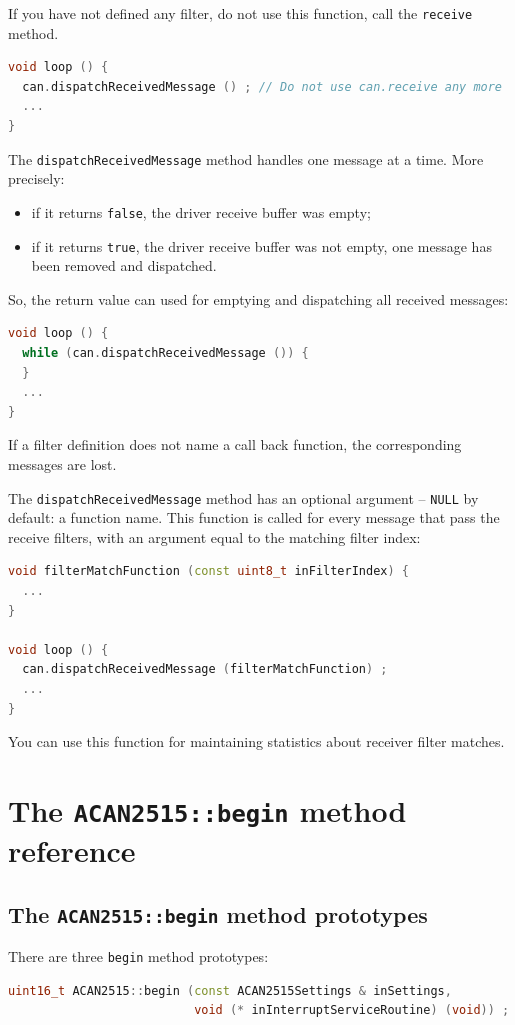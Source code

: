 \documentclass[9pt, a4paper, obeyspaces]{extarticle}
\newcommand \sectionLabel[2]{\section{#1}\label{sec:#2}}
\begin{document}
If you have not defined any filter, do not use this function, call the \texttt{receive} method.


{ \small\begin{lstlisting}[language=c++]
void loop () {
  can.dispatchReceivedMessage () ; // Do not use can.receive any more
  ...
}
\end{lstlisting}}

The \texttt{dispatchReceivedMessage} method handles one message at a time. More precisely:
\begin{itemize}
  \item if it returns \texttt{false}, the driver receive buffer was empty;
  \item if it returns \texttt{true}, the driver receive buffer was not empty, one message has been removed and dispatched.
\end{itemize}

So, the return value can used for emptying and dispatching all received messages:
{ \small\begin{lstlisting}[language=c++]
void loop () {
  while (can.dispatchReceivedMessage ()) {
  }
  ...
}
\end{lstlisting}}

If a filter definition does not name a call back function, the corresponding messages are lost.

The \texttt{dispatchReceivedMessage} method has an optional argument -- \texttt{NULL} by default: a function name. This function is called for every message that pass the receive filters, with an argument equal to the matching filter index:

{ \small\begin{lstlisting}[language=c++]
void filterMatchFunction (const uint8_t inFilterIndex) {
  ...
}

void loop () {
  can.dispatchReceivedMessage (filterMatchFunction) ;
  ...
}
\end{lstlisting}}

You can use this function for maintaining statistics about receiver filter matches.


\sectionLabel{The \texttt{ACAN2515::begin} method reference}{beginMethodReference}

\subsection{The \texttt{ACAN2515::begin} method prototypes}

There are three \texttt{begin} method prototypes:
{ \small\begin{lstlisting}[language=c++]
uint16_t ACAN2515::begin (const ACAN2515Settings & inSettings,
                          void (* inInterruptServiceRoutine) (void)) ;
\end{lstlisting}}
\end{document}
